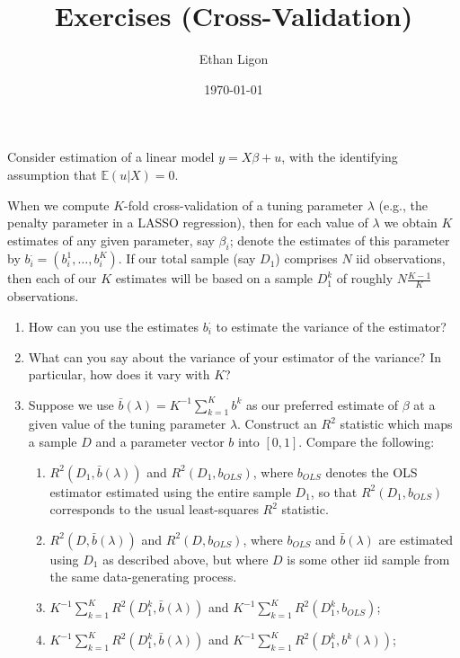 \documentclass[12pt]{amsart}
\author{Ethan Ligon}
\date{\today}
\title{Exercises (Cross-Validation)}
\renewcommand{\E}{\ensuremath{\mathds{E}}}
\begin{document}
\maketitle
Consider estimation of a linear model \(y = X\beta + u\), with the
identifying assumption that \(\E(u|X)=0\).  

When we compute \(K\)-fold cross-validation of a tuning parameter \(\lambda\)
(e.g., the penalty parameter in a LASSO regression), then for each value of
\(\lambda\) we obtain \(K\) estimates of any given parameter, say
\(\beta_i\); denote the estimates of this parameter by
\(b_{i}^\cdot=(b_{i}^1,\dots,b_{i}^K)\).  If our total sample (say
\(D_1\)) comprises
\(N\) iid observations, then each of our \(K\) estimates will be based
on a sample \(D_1^k\) of roughly \(N\frac{K-1}{K}\) observations.

\begin{enumerate}
\item How can you use the estimates \(b_{i}^\cdot\) to estimate the
variance of the estimator?

\item What can you say about the variance of your estimator of the
variance?  In particular, how does it vary with \(K\)?

\item Suppose we use \(\bar{b}(\lambda)=K^{-1}\sum_{k=1}^K b^{k}\) as our
preferred estimate of \(\beta\) at a given value of the tuning
parameter \(\lambda\).  Construct an \(R^2\) statistic which maps a
sample \(D\) and a parameter vector \(b\) into \([0,1]\).  Compare the
following:

\begin{enumerate}
\item \(R^2(D_1,\bar{b}(\lambda))\) and \(R^2(D_1,b_{OLS})\), where
\(b_{OLS}\) denotes the OLS estimator estimated using the entire
sample \(D_1\), so that \(R^2(D_1,b_{OLS})\) corresponds to the
usual least-squares \(R^2\) statistic.

\item \(R^2(D,\bar{b}(\lambda))\) and \(R^2(D,b_{OLS})\), where
\(b_{OLS}\) and \(\bar{b}(\lambda)\) are estimated using \(D_1\) as
described above, but where \(D\) is some other iid sample from
the same data-generating process.

\item \(K^{-1}\sum_{k=1}^K R^2(D_1^k,\bar{b}(\lambda))\) and
\(K^{-1}\sum_{k=1}^K R^2(D_1^k,b_{OLS})\);

\item \(K^{-1}\sum_{k=1}^K R^2(D_1^k,\bar{b}(\lambda))\) and
\(K^{-1}\sum_{k=1}^K R^2(D_1^k,b^{k}(\lambda))\);


\end{enumerate}
\end{enumerate}
\end{document}
